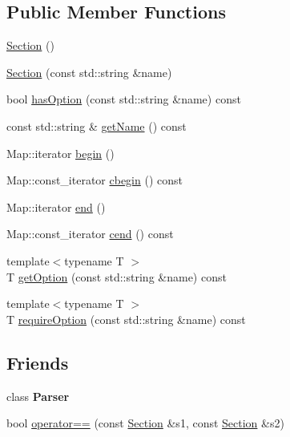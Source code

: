 \subsection*{Public Member Functions}
\begin{DoxyCompactItemize}
\item 
\hyperlink{a00054_a46d86e76bd25b62b655cae19f6d88924}{Section} ()
\item 
\hyperlink{a00054_a567da2532772049403aeabbfe7f6853f}{Section} (const std\-::string \&name)
\item 
bool \hyperlink{a00054_afbbb4e4e55e5757b00ee65f8081c6850}{has\-Option} (const std\-::string \&name) const 
\item 
const std\-::string \& \hyperlink{a00054_a009a772027ebc917d9bc3f3ed195647a}{get\-Name} () const 
\item 
Map\-::iterator \hyperlink{a00054_a00c31fc20d740aae28b11d5cc6b0a229}{begin} ()
\item 
Map\-::const\-\_\-iterator \hyperlink{a00054_a0cb0176b34def84839e150c87716e8a6}{cbegin} () const 
\item 
Map\-::iterator \hyperlink{a00054_aee03a3481b8b066dfbefcb090b7b00d7}{end} ()
\item 
Map\-::const\-\_\-iterator \hyperlink{a00054_a16f0cb0d3253a1f877cf9c4dffda33b3}{cend} () const 
\item 
{\footnotesize template$<$typename T $>$ }\\T \hyperlink{a00054_ad6881999e7896fb3f77da955d9b18bed}{get\-Option} (const std\-::string \&name) const 
\item 
{\footnotesize template$<$typename T $>$ }\\T \hyperlink{a00054_add315aec8dec70a3b65b953206a565be}{require\-Option} (const std\-::string \&name) const 
\end{DoxyCompactItemize}
\subsection*{Friends}
\begin{DoxyCompactItemize}
\item 
\hypertarget{a00054_ab80291af9c262f63b83fa9c16f12014d}{class {\bfseries Parser}}\label{a00054_ab80291af9c262f63b83fa9c16f12014d}

\item 
bool \hyperlink{a00054_a53346e53f62ea0419f6103d037f1b050}{operator==} (const \hyperlink{a00054}{Section} \&s1, const \hyperlink{a00054}{Section} \&s2)
\end{DoxyCompactItemize}


